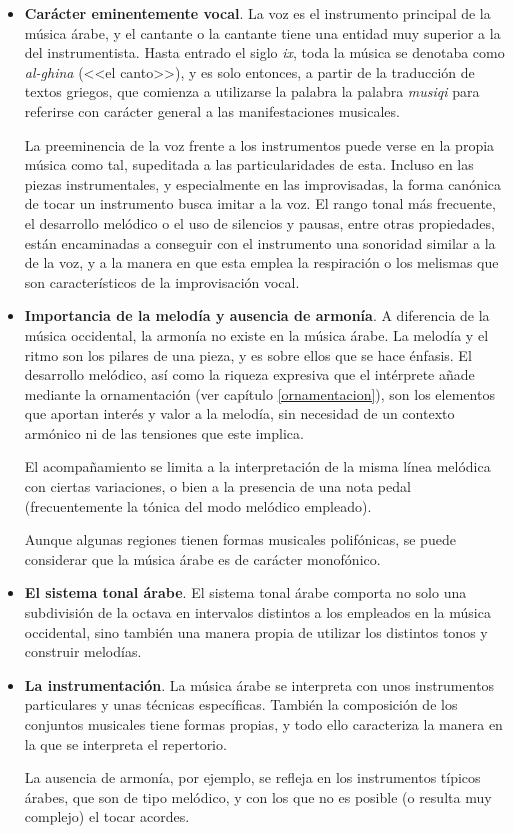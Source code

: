     \begin{itemize}
    \item \textbf{Carácter eminentemente vocal}. La voz es el instrumento principal de la música árabe, y el cantante o la cantante tiene una entidad muy superior a la del instrumentista. Hasta entrado el siglo \emph{ix}, toda la música se denotaba como \emph{al-ghina} (<<el canto>>), y es solo entonces, a partir de la traducción de textos griegos, que comienza a utilizarse la palabra la palabra \emph{musiqi} para referirse con carácter general a las manifestaciones musicales.

    La preeminencia de la voz frente a los instrumentos puede verse en la propia música como tal, supeditada a las particularidades de esta. Incluso en las piezas instrumentales, y especialmente en las improvisadas, la forma canónica de tocar un instrumento busca imitar a la voz. El rango tonal más frecuente, el desarrollo melódico o el uso de silencios y pausas, entre otras propiedades, están encaminadas a conseguir con el instrumento una sonoridad similar a la de la voz, y a la manera en que esta emplea la respiración o los melismas que son característicos de la improvisación vocal.

    \item \textbf{Importancia de la melodía y ausencia de armonía}. A diferencia de la música occidental, la armonía no existe en la música árabe. La melodía y el ritmo son los pilares de una pieza, y es sobre ellos que se hace énfasis. El desarrollo melódico, así como la riqueza expresiva que el intérprete añade mediante la ornamentación (ver capítulo \ref{ornamentacion}), son los elementos que aportan interés y valor a la melodía, sin necesidad de un contexto armónico ni de las tensiones que este implica.

    El acompañamiento se limita a la interpretación de la misma línea melódica con ciertas variaciones, o bien a la presencia de una nota pedal (frecuentemente la tónica del modo melódico empleado).

    Aunque algunas regiones tienen formas musicales polifónicas, se puede considerar que la música árabe es de carácter monofónico.

    \item \textbf{El sistema tonal árabe}. El sistema tonal árabe comporta no solo una subdivisión de la octava en intervalos distintos a los empleados en la música occidental, sino también una manera propia de utilizar los distintos tonos y construir melodías.

    \item \textbf{La instrumentación}. La música árabe se interpreta con unos instrumentos particulares y unas técnicas específicas. También la composición de los conjuntos musicales tiene formas propias, y todo ello caracteriza la manera en la que se interpreta el repertorio.

    La ausencia de armonía, por ejemplo, se refleja en los instrumentos típicos árabes, que son de tipo melódico, y con los que no es posible (o resulta muy complejo) el tocar acordes.
    \end{itemize}


